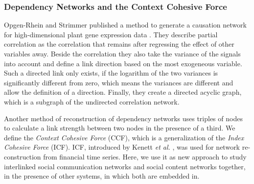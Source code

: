 \documentclass[a4paper,10pt]{scrbook}
\begin{document}

\subsubsection{Dependency Networks and the Context Cohesive Force}
\label{adopt.ICF}  

Opgen-Rhein and Strimmer published a method to generate a causation network for high-dimensional plant gene expression data \cite{Opgen-Rhein2007}. They describe partial correlation as the correlation that remains after regressing the effect of other variables away. Beside the correlation they also take the variance of the signals into account and define a link direction based on the most exogeneous variable. Such a directed link only exists, if the logarithm of the two variances is significantly different from zero, which means the variances are different and allow the definition of a direction. Finally, they create a directed acyclic graph, which is a subgraph of the undirected correlation network.  																																					
%
%

Another method of reconstruction of dependency networks uses triples of nodes to calculate a link strength between two nodes in the presence of a third. We define the \textit{Context Cohesive Force} (CCF), which is a generalization of the \textit{Index Cohesive Force} (ICF). ICF, introduced by Kenett \textit{et al.} \cite{Kenett2011}, was used for network re-construction from financial time series. Here, we use it as new approach to study interlinked social communication networks and social content networks together, in the presence of other systems, in which both are embedded in.

 
\end{document}
